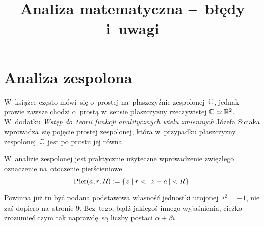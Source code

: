 \documentclass[a4paper,11pt]{article}
\title{Analiza matematyczna --~błędy i~uwagi}
\begin{document}





\maketitle  %





\section{Analiza zespolona}

\vspace{\spaceTwo}






\start W~książce często mówi~się o~prostej na~płaszczyźnie
zespolonej~$\mathbb{C}$, jednak prawie zawsze chodzi o~prostą w~sensie
płaszczyzny rzeczywistej $\mathbb{C} \simeq \mathbb{R}^{ 2 }$. W~dodatku \textit{Wstęp
  do~teorii funkcji analitycznych wielu zmiennych} Józefa Siciaka
wprowadza~się pojęcie prostej zespolonej, która w~przypadku
płaszczyzny zespolonej~$\mathbb{C}$ jest po prostu jej równa.

\vspace{\spaceFour}



\start W~analizie zespolonej jest praktycznie użyteczne wprowadzenie
zwięzłego oznaczenie na~otoczenie pierścieniowe
\begin{equation}
  \label{eq:Leja-01}
  \textrm{Pier}(a, r, R) := \{ z \;|\; r < |\, {  z - a  } \,| < R \}.
\end{equation}

\vspace{\spaceFour}



\start {} Powinna już tu być podana podstawowa własność jednostki
urojonej~$i^{ 2 } = -1$, nie zaś dopiero na~stronie 9. Bez~tego, bądź
jakiegoś innego wyjaśnienia, ciężko zrozumieć czym tak naprawdę~są
liczby postaci $\alpha + \beta i$.
\end{document}
